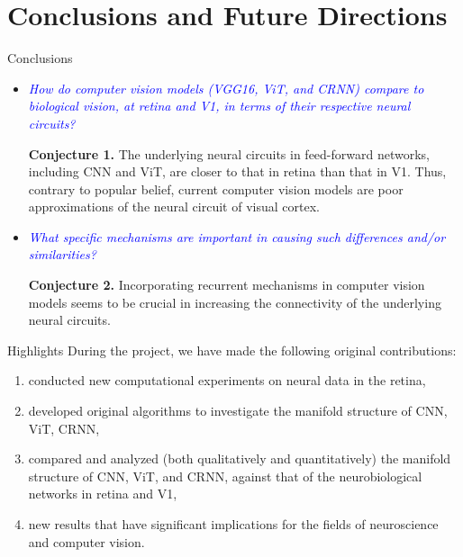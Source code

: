 \documentclass[xcolor={dvipsnames,svgnames}]{beamer}
\begin{document}
\section[Conclusions]{Conclusions and Future Directions}
\begin{frame}{Conclusions}
\begin{itemize}
    \item \textcolor{blue}{\textit{How do computer vision models (VGG16, ViT, and CRNN) compare to biological vision, at retina and V1, in terms of their respective neural circuits?}}
    
    \textbf{Conjecture 1.} The underlying neural circuits in feed-forward networks, including CNN and ViT, are closer to that in retina than that in V1. Thus, contrary to popular belief, current computer vision models are poor approximations of the neural circuit of visual cortex.
    
    \item \textcolor{blue}{\textit{What specific mechanisms are important in causing such differences and/or similarities?}}
    
    \textbf{Conjecture 2.} Incorporating recurrent mechanisms in computer vision models seems to be crucial in increasing the connectivity of the underlying neural circuits. 
\end{itemize}
\end{frame}
\begin{frame}{Highlights}
During the project, we have made the following original contributions:
\begin{enumerate}
    \item conducted new computational experiments on neural data in the retina,
    \item developed original algorithms to investigate the manifold structure of CNN, ViT, CRNN,
    \item compared and analyzed (both qualitatively and quantitatively) the manifold structure of CNN, ViT, and CRNN, against that of the neurobiological networks in retina and V1,
    \item new results that have significant implications for the fields of neuroscience and computer vision.
\end{enumerate}
\end{frame}
\end{document}
